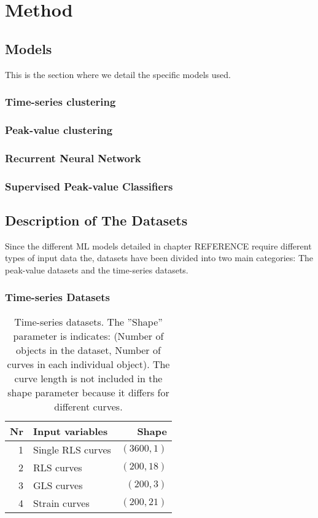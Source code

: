 \chapter{Method}

\section{Models} 
This is the section where we detail the specific models used. \bigskip

\subsection{Time-series clustering}

\subsection{Peak-value clustering}

\subsection{Recurrent Neural Network}

\subsection{Supervised Peak-value Classifiers}

\section{Description of The Datasets}

Since the different ML models detailed in chapter REFERENCE require different types of input data the, datasets have been divided into two main categories: 
The peak-value datasets and the time-series datasets. \bigskip

\subsection{Time-series Datasets}

\begin{table*}[h]
    \centering
    \begin{tabular}{ rlr }
        \toprule
        Nr & Input variables   & Shape \\
        \midrule
        1  & Single RLS curves & $(3600,1)$ \\
        2  & RLS curves        & $(200,18)$ \\
        3  & GLS curves        & $(200,3)$  \\
        4  & Strain curves     & $(200,21)$ \\
        \bottomrule
    \end{tabular}
    \caption{Time-series datasets. The ''Shape'' parameter is indicates: (Number of objects in the dataset, Number of curves in each individual object). The curve length is not included in the shape parameter because it differs for different curves.}
    \label{tab:ts_dsets}
\end{table*}

